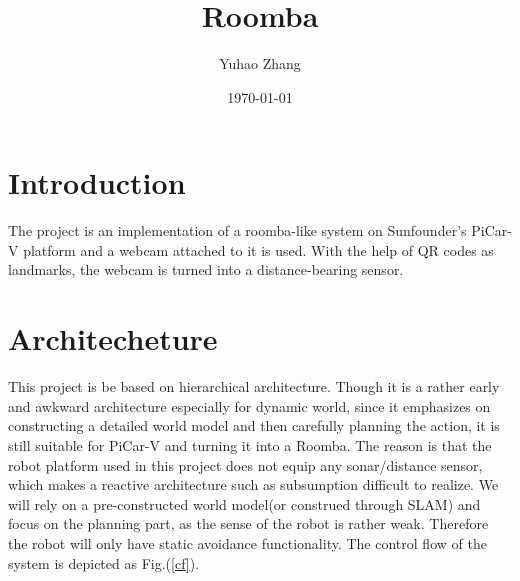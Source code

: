 \documentclass[12pt]{article}
\title{Roomba}
\author{Yuhao Zhang}
\date{\today}
\begin{document}
\maketitle


%
\section{Introduction}
The project is an implementation of a roomba-like system on Sunfounder's PiCar-V platform and a webcam attached to it is used. With the help of QR codes as landmarks, the webcam is turned into a distance-bearing sensor.
\section{Architecheture}
\label{arch}
This project is be based on hierarchical architecture. Though it is a rather early and awkward architecture especially for dynamic world, since it emphasizes on constructing a detailed world model and then carefully planning the action, it is still suitable for PiCar-V and turning it into a Roomba. The reason is that the robot platform used in this project does not equip any sonar/distance sensor, which makes a reactive architecture such as subsumption difficult to realize. We will rely on a pre-constructed world model(or construed through SLAM) and focus on the planning part, as the sense of the robot is rather weak. Therefore the robot will only have static avoidance functionality. The control flow of the system is depicted as Fig.(\ref{cf}).
\end{document}
